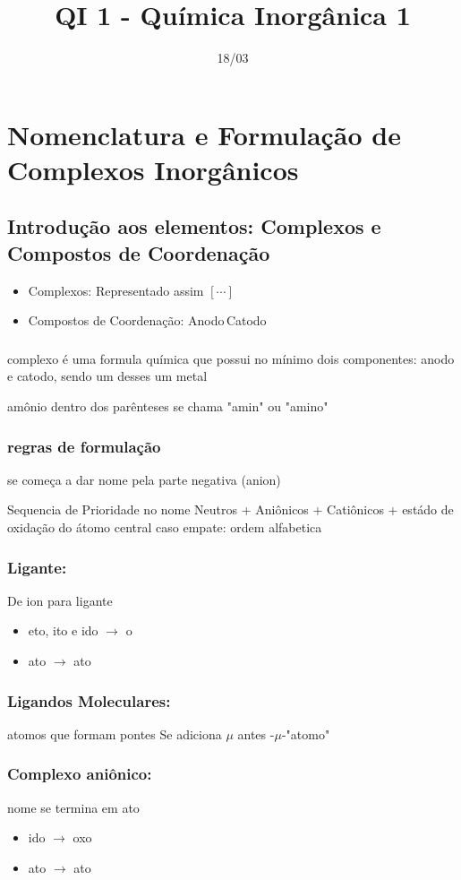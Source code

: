 \documentclass[12pt]{report}
\begin{document}
\title{QI 1 - Química Inorgânica 1}
\date{18/03}

\maketitle

\tableofcontents

\break

\chapter{Nomenclatura e Formulação de Complexos Inorgânicos}

\section{Introdução aos elementos: Complexos e Compostos de Coordenação}

\begin{itemize}
\item Complexos: Representado assim $ [\cdots] $
\item Compostos de Coordenação:  Anodo$\,$Catodo
\end{itemize}

\subsection{}

\break

complexo é uma formula química que possui no mínimo dois componentes: anodo e catodo, sendo um desses um metal

amônio dentro dos parênteses se chama "amin" ou "amino"

\subsection{regras de formulação}

se começa a dar nome pela parte negativa (anion)

Sequencia de Prioridade no nome Neutros + Aniônicos + Catiônicos + estádo de oxidação do átomo central
caso empate: ordem alfabetica

\subsection {Ligante: } De ion para ligante
\begin{itemize}
\item eto, ito e ido $\to$ o
\item ato $\to$ ato
\end{itemize}

\subsection{Ligandos Moleculares: } atomos que formam pontes
Se adiciona $\mu$ antes -$\mu$-"atomo"

\subsection{Complexo aniônico: } nome se termina em ato

\begin{itemize}
\item ido $\to$ oxo
\item ato $\to$ ato
\end{itemize}
\end{document}
